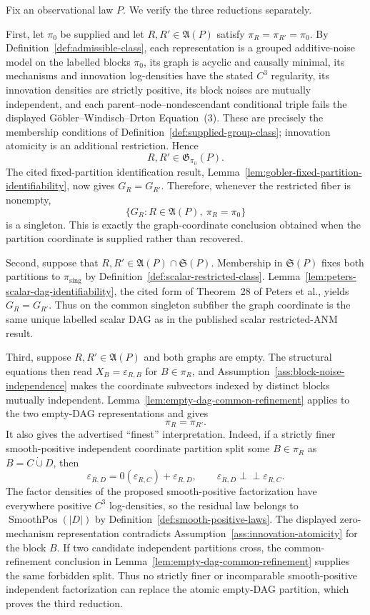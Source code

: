Fix an observational law \(P\).  We verify the three reductions separately.

First, let \(\pi_0\) be supplied and let \(R,R'\in\mathfrak A(P)\) satisfy
\(\pi_R=\pi_{R'}=\pi_0\).  By Definition~\ref{def:admissible-class}, each
representation is a grouped additive-noise model on the labelled blocks
\(\pi_0\), its graph is acyclic and causally minimal, its mechanisms and
innovation log-densities have the stated \(C^3\) regularity, its innovation
densities are strictly positive, its block noises are mutually independent,
and each parent--node--nondescendant conditional triple fails the displayed
Göbler--Windisch--Drton Equation~(3).  These are precisely the membership
conditions of Definition~\ref{def:supplied-group-class}; innovation atomicity
is an additional restriction.  Hence
\[
 R,R'\in\mathfrak G_{\pi_0}(P).
\]
The cited fixed-partition identification result,
Lemma~\ref{lem:gobler-fixed-partition-identifiability}, now gives
\(G_R=G_{R'}\).  Therefore, whenever the restricted fiber is nonempty,
\[
 \bigl\{G_R:R\in\mathfrak A(P),\ \pi_R=\pi_0\bigr\}
\]
is a singleton.  This is exactly the graph-coordinate conclusion obtained
when the partition coordinate is supplied rather than recovered.

Second, suppose that \(R,R'\in\mathfrak A(P)\cap\mathfrak S(P)\).  Membership
in \(\mathfrak S(P)\) fixes both partitions to
\(\pi_{\mathrm{sing}}\) by Definition~\ref{def:scalar-restricted-class}.
Lemma~\ref{lem:peters-scalar-dag-identifiability}, the cited form of
Theorem~28 of Peters et al., yields \(G_R=G_{R'}\).  Thus on the common
singleton subfiber the graph coordinate is the same unique labelled scalar
DAG as in the published scalar restricted-ANM result.

Third, suppose \(R,R'\in\mathfrak A(P)\) and both graphs are empty.  The
structural equations then read \(X_B=\varepsilon_{R,B}\) for
\(B\in\pi_R\), and Assumption~\ref{ass:block-noise-independence} makes the
coordinate subvectors indexed by distinct blocks mutually independent.
Lemma~\ref{lem:empty-dag-common-refinement} applies to the two empty-DAG
representations and gives
\[
 \pi_R=\pi_{R'}.
\]
It also gives the advertised ``finest'' interpretation.  Indeed, if a
strictly finer smooth-positive independent coordinate partition split some
\(B\in\pi_R\) as \(B=C\mathbin{\dot\cup}D\), then
\[
 \varepsilon_{R,D}=0(\varepsilon_{R,C})+\varepsilon_{R,D},
 \qquad
 \varepsilon_{R,D}\perp\!\!\!\perp\varepsilon_{R,C}.
\]
The factor densities of the proposed smooth-positive factorization have
everywhere positive \(C^3\) log-densities, so the residual law belongs to
\(\operatorname{SmoothPos}(|D|)\) by
Definition~\ref{def:smooth-positive-laws}.  The displayed zero-mechanism
representation contradicts Assumption~\ref{ass:innovation-atomicity} for the
block \(B\).  If two candidate independent partitions cross, the
common-refinement conclusion in
Lemma~\ref{lem:empty-dag-common-refinement} supplies the same forbidden split.
Thus no strictly finer or incomparable smooth-positive independent
factorization can replace the atomic empty-DAG partition, which proves the
third reduction.